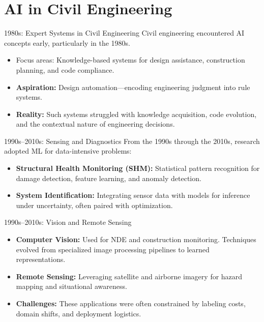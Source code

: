 \documentclass[german,10pt]{beamer}
\begin{document}
\section{AI in Civil Engineering}

\begin{frame}{1980s: Expert Systems in Civil Engineering}
    \justifying
    Civil engineering encountered AI concepts early, particularly in the 1980s.
    \begin{itemize}
        \item Focus areas: Knowledge-based systems for design assistance, construction planning, and code compliance.
        \item \textbf{Aspiration:} Design automation—encoding engineering judgment into rule systems.
        \item \textbf{Reality:} Such systems struggled with knowledge acquisition, code evolution, and the contextual nature of engineering decisions.
    \end{itemize}
\end{frame}

\begin{frame}{1990s--2010s: Sensing and Diagnostics}
    \justifying
    From the 1990s through the 2010s, research adopted ML for data-intensive problems:
    
    \begin{itemize}
        \item \textbf{Structural Health Monitoring (SHM):} Statistical pattern recognition for damage detection, feature learning, and anomaly detection.
        \item \textbf{System Identification:} Integrating sensor data with models for inference under uncertainty, often paired with optimization.
    \end{itemize}
\end{frame}

\begin{frame}{1990s--2010s: Vision and Remote Sensing}
    \justifying
    \begin{itemize}
        \item \textbf{Computer Vision:} Used for NDE and construction monitoring. Techniques evolved from specialized image processing pipelines to learned representations.
        \item \textbf{Remote Sensing:} Leveraging satellite and airborne imagery for hazard mapping and situational awareness.
        \item \textbf{Challenges:} These applications were often constrained by labeling costs, domain shifts, and deployment logistics.
    \end{itemize}
\end{frame}
\end{document}
